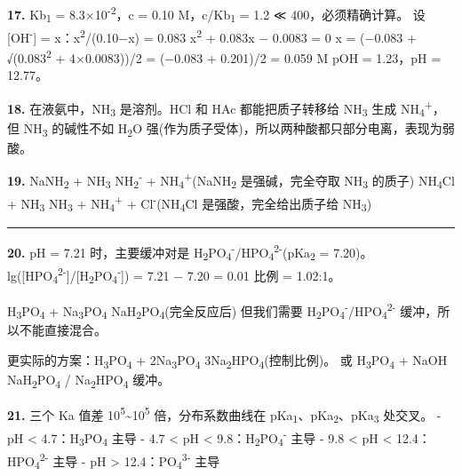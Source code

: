 \textbf{17.} Kb\textsubscript{1} = 8.3×10\textsuperscript{-2}，c = 0.10 M，c/Kb\textsubscript{1} = 1.2 ≪ 400，必须精确计算。
设 {[}OH\textsuperscript{-}{]} = x：x\textsuperscript{2}/(0.10−x) = 0.083 \箭 x\textsuperscript{2} + 0.083x − 0.0083 = 0
x = (−0.083 + √(0.083\textsuperscript{2} + 4×0.0083))/2 = (−0.083 + 0.201)/2 = 0.059 M
pOH = 1.23，pH = 12.77。

\textbf{18.} 在液氨中，NH\textsubscript{3} 是溶剂。HCl 和 HAc 都能把质子转移给 NH\textsubscript{3} 生成 NH\textsubscript{4}\textsuperscript{+}，但 NH\textsubscript{3} 的碱性不如 H\textsubscript{2}O 强(作为质子受体)，所以两种酸都只部分电离，表现为弱酸。

\textbf{19.} NaNH\textsubscript{2} + NH\textsubscript{3} \箭 NH\textsubscript{2}\textsuperscript{-} + NH\textsubscript{4}\textsuperscript{+}(NaNH\textsubscript{2} 是强碱，完全夺取 NH\textsubscript{3} 的质子)
NH\textsubscript{4}Cl + NH\textsubscript{3} \箭 NH\textsubscript{3} + NH\textsubscript{4}\textsuperscript{+} + Cl\textsuperscript{-}(NH\textsubscript{4}Cl 是强酸，完全给出质子给 NH\textsubscript{3})

\begin{center}\rule{0.5\linewidth}{0.5pt}\end{center}

\textbf{20.} pH = 7.21 时，主要缓冲对是 H\textsubscript{2}PO\textsubscript{4}\textsuperscript{-}/HPO\textsubscript{4}\textsuperscript{2-}(pKa\textsubscript{2} = 7.20)。
lg({[}HPO\textsubscript{4}\textsuperscript{2-}{]}/{[}H\textsubscript{2}PO\textsubscript{4}\textsuperscript{-}{]}) = 7.21 − 7.20 = 0.01 \箭 比例 = 1.02:1。

H\textsubscript{3}PO\textsubscript{4} + Na\textsubscript{3}PO\textsubscript{4}  NaH\textsubscript{2}PO\textsubscript{4}(完全反应后)
但我们需要 H\textsubscript{2}PO\textsubscript{4}\textsuperscript{-}/HPO\textsubscript{4}\textsuperscript{2-} 缓冲，所以不能直接混合。

更实际的方案：H\textsubscript{3}PO\textsubscript{4} + 2Na\textsubscript{3}PO\textsubscript{4} \箭 3Na\textsubscript{2}HPO\textsubscript{4}(控制比例)。
或 H\textsubscript{3}PO\textsubscript{4} + NaOH \箭 NaH\textsubscript{2}PO\textsubscript{4} / Na\textsubscript{2}HPO\textsubscript{4} 缓冲。

\textbf{21.} 三个 Ka 值差 10\textsuperscript{5}\textasciitilde10\textsuperscript{5} 倍，分布系数曲线在 pKa\textsubscript{1}、pKa\textsubscript{2}、pKa\textsubscript{3} 处交叉。
- pH \textless{} 4.7：H\textsubscript{3}PO\textsubscript{4} 主导
- 4.7 \textless{} pH \textless{} 9.8：H\textsubscript{2}PO\textsubscript{4}\textsuperscript{-} 主导
- 9.8 \textless{} pH \textless{} 12.4：HPO\textsubscript{4}\textsuperscript{2-} 主导
- pH \textgreater{} 12.4：PO\textsubscript{4}\textsuperscript{3-} 主导


